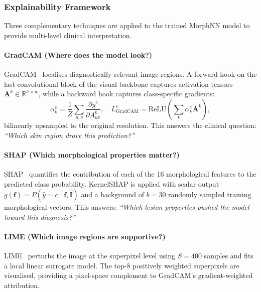 \documentclass[preprint,12pt]{elsarticle}
\begin{document}
\subsubsection{Explainability Framework}
\label{sec:explainability}

Three complementary techniques are applied to the trained MorphNN model
to provide multi-level clinical interpretation.

\paragraph{GradCAM (Where does the model look?)}
GradCAM~\cite{selvaraju2020gradcam} localises diagnostically relevant
image regions.  A forward hook on the last convolutional block of the
visual backbone captures activation tensors
$\mathbf{A}^k \in \mathbb{R}^{h\times w}$, while a backward hook
captures class-specific gradients:
\begin{equation}
  \alpha_k^c = \frac{1}{Z}\sum_{u,v}\frac{\partial y^c}{\partial A^k_{uv}},
  \quad
  L^c_{\mathrm{GradCAM}} = \mathrm{ReLU}\!\left(\sum_k \alpha_k^c \mathbf{A}^k\right),
  \label{eq:gradcam}
\end{equation}
bilinearly upsampled to the original resolution.  This answers the
clinical question: \emph{``Which skin region drove this prediction?''}

\paragraph{SHAP (Which morphological properties matter?)}
SHAP~\cite{lundberg2017shap} quantifies the contribution of each of
the 16 morphological features to the predicted class probability.
KernelSHAP is applied with scalar output
$g(\mathbf{f}) = P(\hat{y}=c\mid\mathbf{f},\hat{\mathbf{I}})$ and a
background of $b = 30$ randomly sampled training morphological vectors.
This answers: \emph{``Which lesion properties pushed the model toward
this diagnosis?''}

\paragraph{LIME (Which image regions are supportive?)}
LIME~\cite{ribeiro2016lime} perturbs the image at the superpixel level
using $S = 400$ samples and fits a local linear surrogate model.  The
top-8 positively weighted superpixels are visualised, providing a
pixel-space complement to GradCAM's gradient-weighted attribution.
\end{document}
